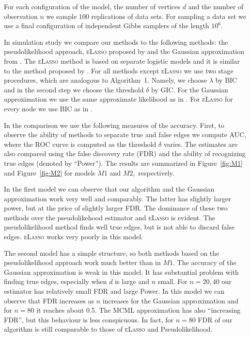 \documentclass[twoside,11pt]{article}
\begin{document}
For each configuration of the model, the number of vertices $d$ and the number of observation $n$ we sample $100$ replications of data sets. 
For sampling a data set we use a final configuration of independent Gibbs samplers of the length $10^6$.

In simulation study we compare our methods to the following methods: the pseudolikelihood approach,  \textsc{eLasso} proposed by \citet{Borkulo2014} and the Gaussian approximation
from \citet{banerjee08}. The \textsc{eLasso} method is based on separate logistic models and it is similar to the method proposed by \citet{Ravi10}. For all methods except
\textsc{eLasso} we use two stage procedures, which are analogous to Algorithm~1. Namely, we choose $\lambda$ by BIC  and in the second step we choose the threshold $\delta$ by GIC. 
 For the Gaussian approximation we use the same approximate likelihood as in \citet{Viallon2013}. For \textsc{eLasso} for every node we use BIC as in \citet{Borkulo2014}. 


In the comparison we use the following measures of the accuracy. First, to observe the ability of methods to separate true and false edges we compute AUC, where the ROC curve is computed as the threshold $\delta$ varies.
The estimates are also compared using the false discovery rate (FDR) and the ability of recognizing true edges (denoted by
``Power''). The results are summarized in Figure~\ref{fig:M1} and Figure~\ref{fig:M2} for models $M1$ and $M2,$  respectively.

In the first model we can observe that our algorithm and the Gaussian approximation work very well and comparably. The latter has slightly larger power, but at the price of slightly larger FDR. The dominance of these two methods over the pseudolikehood estimator and \textsc{eLasso} is evident. The pseudolikelihood method finds well true edges, but is not able to discard false edges. \textsc{eLasso} works very poorly in this model.  

The second model has a simple structure, so both methods based on the pseudolikelihood approach work much better than in $M1.$ The accuracy of the Gaussian approximation is weak in this model. It has substantial problem with finding true edges, especially when $d$ is large and $n$ small. For $n=20,40$ our estimator has relatively small FDR and large Power. In this model we can observe that FDR increases as $n$ increases for the Gaussian approximation  and for $n=80$ it reaches about 0.5. The MCML approximation has also ``increasing FDR'', but this behaviour is less conspicuous.
In fact, for $n=80$ FDR of our algorithm is still comparable to those of \textsc{eLasso} and Pseudolikelihood.
\end{document}
